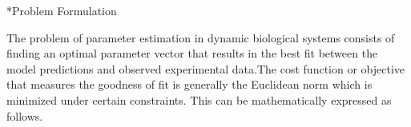\documentclass[12pt]{article}
\makeatletter
\renewcommand\section{\@startsection
	{subsection}{2}{0mm}
	{-0.2in}
	{0.05\baselineskip}
	{\normalfont\large\bfseries}}
\makeatother
\begin{document}

\section*{Problem Formulation}

The problem of parameter estimation in dynamic biological systems consists of finding an optimal parameter vector that results in the best fit between the model predictions and observed experimental data.The cost function or objective that measures the goodness of fit is generally the Euclidean norm which is minimized under certain constraints. This can be mathematically expressed as follows.
\end{document}
